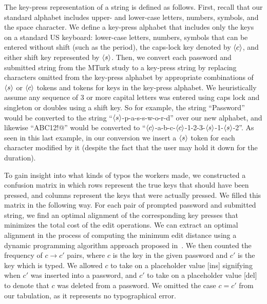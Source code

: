 The key-press representation of a string is defined as follows. First, recall
that our standard alphabet includes 
upper- and lower-case letters, numbers, symbols, and
the space character. We define a key-press alphabet that includes only the keys
on a standard US keyboard: lower-case letters, numbers, symbols that can be
entered without shift (such as the period), the caps-lock key denoted
by $\langle c \rangle$, and either shift key represented by $\langle s \rangle$. 
Then, we convert each password and submitted string from the MTurk
study to a key-press string by replacing characters omitted from the
key-press alphabet by appropriate combinations of $\langle s \rangle$ or $\langle c \rangle$ tokens
and tokens for keys in the key-press alphabet.  We heuristically assume any sequence
of 3 or more capital letters was entered using caps lock and
singleton or doubles using a shift key.  So for example, the string
``{Password}'' would be converted to the string
``{$\langle s \rangle$-p-a-s-s-w-o-r-d}'' over our new alphabet, and likewise
``{ABC12!@}'' would be converted to
``{$\langle c \rangle$-a-b-c-$\langle c \rangle$-1-2-3-$\langle s \rangle$-1-$\langle s \rangle$-2}''.  As seen in
this last example, in our conversion we insert a $\langle s \rangle$ token for each
character modified by it (despite the fact that the user may hold it
down for the duration).
%

To gain insight into what kinds of typos the workers made, we constructed a confusion matrix
in which rows represent the true keys that should have been pressed, and
columns represent the keys that were actually pressed.  We filled this matrix
in the following way. For each pair of prompted password and
submitted string, we find an optimal alignment of the corresponding
key presses that minimizes the total cost of the edit operations.  We
can extract an optimal alignment in the process of computing the
minimum edit distance using a dynamic programming algorithm approach proposed
in~\cite{smith1981identification}.  We then counted the frequency of
$c\rightarrow c'$ pairs, where $c$ is the key in the given password
and $c'$ is the key which is typed. We allowed $c$ to take on a placeholder value
[ins] signifying when $c'$ was inserted into a password, and $c'$ to
take on a placeholder value [del] to denote that $c$ was deleted from
a password. We omitted the case $c = c'$ from our tabulation, as it represents no typographical error.

